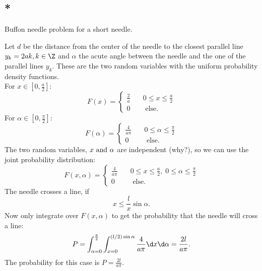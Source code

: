 \subsection{*}
Buffon needle problem for a short needle.
\begin{solution} %
	Let $d$ be the distance from the center of the needle to the closest parallel line $y_k = 2ak,k \in \Z$ and $\alpha$ the acute angle between the needle and the one of the parallel lines $y_k$. These are the two random variables with the uniform probability density functions.\\
	For $x\in [0,\frac{a}{2}]$:
	\[
		F(x) = \begin{cases}
		\frac{2}{a} \quad& 0 \le x \le \frac{a}{2}\\
		0 \quad & \text{ else}.
		\end{cases}
	\]
	For $\alpha \in [0,\frac{\pi}{2}]$:
	\[
		F(\alpha) = \begin{cases}
		\frac{4}{a\pi} \quad& 0 \le \alpha \le \frac{\pi}{2}\\
		0 \quad & \text{ else}.
		\end{cases}
	\]
	The two random variables, $x \text{ and } \alpha$ are independent (why?), so we can use the joint probability distribution:
	\[
		F(x,\alpha) = \begin{cases}
			\frac{4}{a\pi} \quad & 0 \le x \le \frac{a}{2},\;0\le \alpha \le \frac{\pi}{2}\\
			0 \quad & \text{ else}.
		\end{cases}
	\]
	The needle crosses a line, if
	\[
		x \le \frac{l}{x} \sin \alpha.
	\]
	Now only integrate over $F(x,\alpha)$ to get the probability that the needle will cross a line:
	\[
		P = \int_{\alpha = 0}^{\frac{\pi}{2}}\int_{x=0}^{(l/2)\sin \alpha} \frac{4}{a \pi} \d x \d \alpha = \frac{2l}{a \pi}.
	\] 
	The probability for this case is $P = \frac{2l}{a \pi}$.
\end{solution}